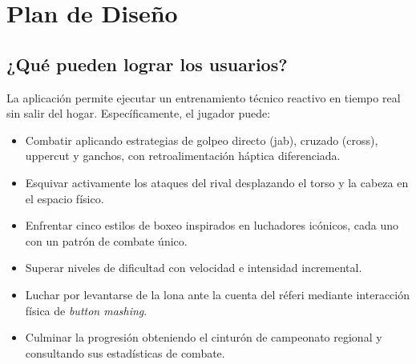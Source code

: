 \begin{table}[H]
\centering
\caption{Cumplimiento del Entregable 2.}
\end{table}

\section{Plan de Diseño}
\label{sec:plan}
\subsection{¿Qué pueden lograr los usuarios?}
La aplicación permite ejecutar un entrenamiento técnico reactivo en tiempo real sin salir del hogar. Específicamente, el jugador puede:
\begin{itemize}
  \item Combatir aplicando estrategias de golpeo directo (jab), cruzado (cross), uppercut y ganchos, con retroalimentación háptica diferenciada.
  \item Esquivar activamente los ataques del rival desplazando el torso y la cabeza en el espacio físico.
  \item Enfrentar cinco estilos de boxeo inspirados en luchadores icónicos, cada uno con un patrón de combate único.
  \item Superar niveles de dificultad con velocidad e intensidad incremental.
  \item Luchar por levantarse de la lona ante la cuenta del réferi mediante interacción física de \emph{button mashing}.
  \item Culminar la progresión obteniendo el cinturón de campeonato regional y consultando sus estadísticas de combate.
\end{itemize}

